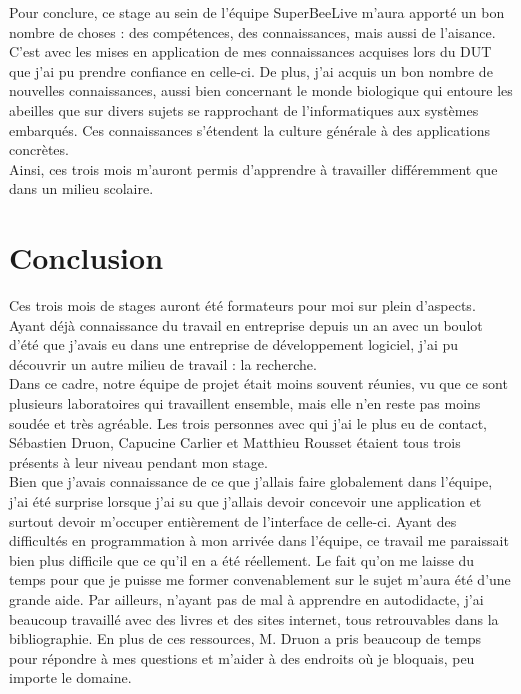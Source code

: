 \documentclass[11pt,french,a4paper]{report}
\begin{document}
Pour conclure, ce stage au sein de l'équipe SuperBeeLive m'aura apporté un bon nombre de choses : des compétences, des connaissances, mais 
aussi de l'aisance. C'est avec les mises en application de mes connaissances acquises lors du DUT que j'ai pu prendre confiance en celle-ci.
De plus, j'ai acquis un bon nombre de nouvelles connaissances, aussi bien concernant le monde biologique qui entoure les abeilles que sur 
divers sujets se rapprochant de l'informatiques aux systèmes embarqués. Ces connaissances s'étendent la culture générale à des applications 
concrètes.\\
Ainsi, ces trois mois m'auront permis d'apprendre à travailler différemment que dans un milieu scolaire. 


\chapter{Conclusion}
Ces trois mois de stages auront été formateurs pour moi sur plein d'aspects. Ayant déjà connaissance du travail en entreprise depuis un an
avec un boulot d'été que j'avais eu dans une entreprise de développement logiciel, j'ai pu découvrir un autre milieu de travail : 
la recherche. \\
Dans ce cadre, notre équipe de projet était moins souvent réunies, vu que ce sont plusieurs laboratoires qui travaillent ensemble, 
mais elle n'en reste pas moins soudée et très agréable. Les trois personnes avec qui j'ai le plus eu de contact, Sébastien Druon, 
Capucine Carlier et Matthieu Rousset étaient tous trois présents à leur niveau pendant mon stage.  \\
Bien que j'avais connaissance de ce que j'allais faire globalement dans l'équipe, j'ai été surprise lorsque j'ai su que j'allais
devoir concevoir une application et surtout devoir m'occuper entièrement de l'interface de celle-ci. 
Ayant des difficultés en programmation à mon arrivée dans l'équipe, ce travail me paraissait bien plus difficile que ce qu'il 
en a été réellement. Le fait qu'on me laisse du temps pour que je puisse me former convenablement sur le sujet m'aura été 
d'une grande aide. Par ailleurs, n'ayant pas de mal à apprendre en autodidacte, j'ai beaucoup travaillé avec des livres et
des sites internet, tous retrouvables dans la bibliographie. En plus de ces ressources, M. Druon a pris beaucoup de temps
pour répondre à mes questions et m'aider à des endroits où je bloquais, peu importe le domaine. \\
\end{document}
